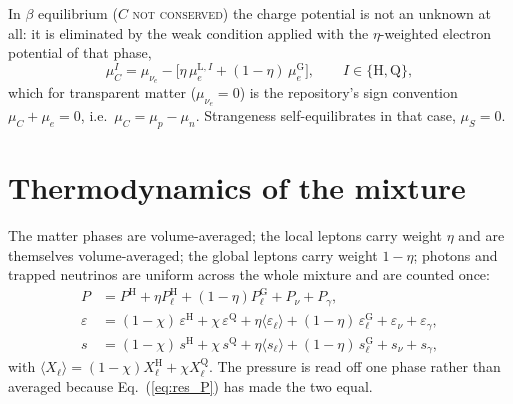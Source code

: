 \documentclass[aps,prc,onecolumn,superscriptaddress,nofootinbib,10pt]{revtex4-2}
\newcommand{\muC}{\mu_C}
\newcommand{\muS}{\mu_S}
\newcommand{\phH}{\mathrm{H}}
\newcommand{\phQ}{\mathrm{Q}}
\begin{document}
In $\beta$ equilibrium ($C$ \textsc{not conserved}) the charge potential is
not an unknown at all: it is eliminated by the weak condition applied with the
$\eta$-weighted electron potential of that phase,
%
\begin{equation}
\muC^{I} = \mu_{\nu_e}
   - \big[ \eta\, \mu_e^{\mathrm{L},I} + (1-\eta)\, \mu_e^{\mathrm{G}} \big] ,
\qquad I \in \{\phH, \phQ\} ,
\label{eq:beta}
\end{equation}
%
which for transparent matter ($\mu_{\nu_e} = 0$) is the repository's sign
convention $\muC + \mu_e = 0$, i.e.\ $\muC = \mu_p - \mu_n$. Strangeness
self-equilibrates in that case, $\muS = 0$.

\section{Thermodynamics of the mixture}

The matter phases are volume-averaged; the local leptons carry weight $\eta$
and are themselves volume-averaged; the global leptons carry weight $1-\eta$;
photons and trapped neutrinos are uniform across the whole mixture and are
counted once:
%
\begin{align}
P &= P^\phH + \eta P_\ell^\phH + (1-\eta) P^{\mathrm{G}}_\ell
     + P_{\nu} + P_{\gamma} ,
\label{eq:Ptot} \\
\varepsilon &= (1-\chi)\, \varepsilon^\phH + \chi\, \varepsilon^\phQ
     + \eta \big\langle \varepsilon_\ell \big\rangle
     + (1-\eta)\, \varepsilon^{\mathrm{G}}_\ell
     + \varepsilon_{\nu} + \varepsilon_{\gamma} ,
\label{eq:epstot} \\
s &= (1-\chi)\, s^\phH + \chi\, s^\phQ
     + \eta \big\langle s_\ell \big\rangle + (1-\eta)\, s^{\mathrm{G}}_\ell
     + s_{\nu} + s_{\gamma} ,
\label{eq:stot}
\end{align}
%
with $\langle X_\ell \rangle = (1-\chi) X_\ell^\phH + \chi X_\ell^\phQ$. The
pressure is read off one phase rather than averaged because
Eq.~(\ref{eq:res_P}) has made the two equal.
\end{document}
